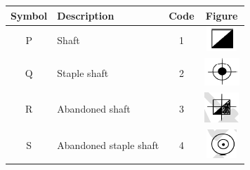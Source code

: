 \begin{center}
  \label{tab:match}
  \begin{tabular}{|c|l|c|c|}
    \hline
    \textbf{Symbol} & \textbf{Description} & \textbf{Code} & \textbf{Figure} \\ \hline
    P & Shaft                    & 1 & \includegraphics[width=0.10\linewidth]{figs/21a.png} \\ 
    Q & Staple shaft             & 2 & \includegraphics[width=0.10\linewidth]{figs/21b.png} \\ 
    R & Abandoned shaft          & 3 & \includegraphics[width=0.10\linewidth]{figs/21c.png} \\ 
    S & Abandoned staple shaft   & 4 & \includegraphics[width=0.10\linewidth]{figs/21d.png} \\ \hline
  \end{tabular}
\end{center}
